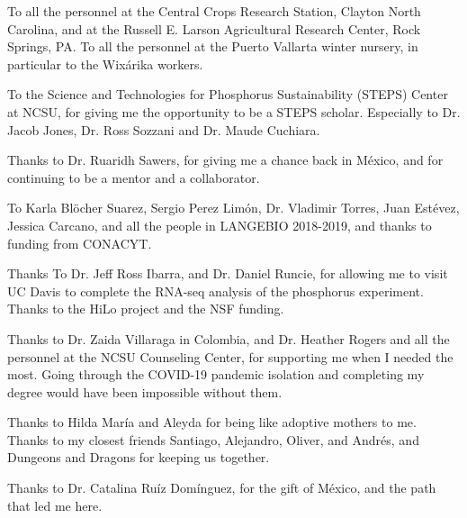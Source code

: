 \begin{acknowledgements}
To all the personnel at the Central Crops Research Station, Clayton North Carolina, and at the Russell E. Larson Agricultural Research Center, Rock Springs, PA.
To all the personnel at the Puerto Vallarta winter nursery, in particular to the Wixárika workers.

To the Science and Technologies for Phosphorus Sustainability (STEPS) Center at NCSU, for giving me the opportunity to be a STEPS scholar.
Especially to  Dr. Jacob Jones, Dr. Ross Sozzani and Dr. Maude Cuchiara.

Thanks to Dr. Ruaridh Sawers, for giving me a chance back in México, and for continuing to be a mentor and a collaborator.

To Karla Blöcher Suarez, Sergio Perez Limón, Dr. Vladimir Torres, Juan Estévez, Jessica Carcano, and all the people in LANGEBIO 2018-2019, and thanks to funding from CONACYT.

Thanks To Dr. Jeff Ross Ibarra, and Dr. Daniel Runcie, for allowing me to visit UC Davis to complete the RNA-seq analysis of the \invfour phosphorus experiment.
Thanks to the HiLo project and the NSF funding.

Thanks to Dr. Zaida Villaraga in Colombia, and Dr. Heather Rogers and all the personnel at the NCSU Counseling Center, for supporting me when I needed the most. 
Going through the COVID-19 pandemic isolation and completing my degree would have been impossible without them.

Thanks to Hilda María and Aleyda for being like adoptive mothers to me.
Thanks to my closest friends Santiago, Alejandro, Oliver, and Andrés, and Dungeons and Dragons for keeping us together. 

Thanks to Dr. Catalina Ruíz Domínguez, for the gift of México, and the path that led me here.

\end{acknowledgements}


\thesistableofcontents

\thesislistoftables

\thesislistoffigures
